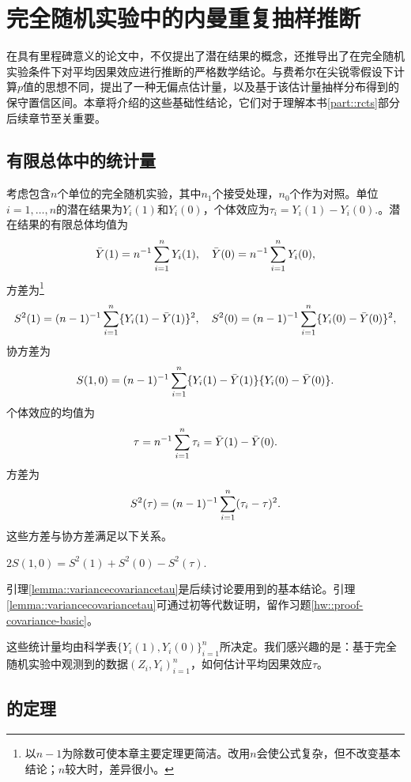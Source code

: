 
\chapter{完全随机实验中的内曼重复抽样推断}\label{chapter::neyman-cr}
 
 
在具有里程碑意义的论文中，\citet{Neyman:1923}不仅提出了潜在结果的概念，还推导出了在完全随机实验条件下对平均因果效应进行推断的严格数学结论。与费希尔在尖锐零假设下计算$p$值的思想不同，\citet{Neyman:1923}提出了一种无偏点估计量，以及基于该估计量抽样分布得到的保守置信区间。本章将介绍\citet{Neyman:1923}的这些基础性结论，它们对于理解本书\ref{part::rcts}部分后续章节至关重要。



\section{有限总体中的统计量}

考虑包含$n$个单位的完全随机实验，其中$n_1$个接受处理，$n_0$个作为对照。单位$i = 1, \ldots, n$的潜在结果为$Y_i(1)$和$Y_i(0)$，个体效应为$\tau_i = Y_i(1) - Y_i(0).$。潜在结果的有限总体均值为
$$
\bar{Y}(1) = n^{-1} \sum_{i=1}^n Y_i(1),\quad
\bar{Y}(0) = n^{-1} \sum_{i=1}^n Y_i(0),
$$
方差为\footnote{以$n-1$为除数可使本章主要定理更简洁。改用$n$会使公式复杂，但不改变基本结论；$n$较大时，差异很小。}
$$
S^2(1) = (n-1)^{-1} \sum_{i=1}^n \{ Y_i(1) -\bar{Y}(1)  \}^2,\quad
S^2(0) = (n-1)^{-1} \sum_{i=1}^n \{ Y_i(0) -\bar{Y}(0)  \}^2 ,
$$
协方差为
$$
S(1,0) = (n-1)^{-1} \sum_{i=1}^n \{ Y_i(1) -\bar{Y}(1)  \}\{ Y_i(0) -\bar{Y}(0)  \} . 
$$
个体效应的均值为
$$
\tau = n^{-1} \sum_{i=1}^n \tau_i = \bar{Y}(1) - \bar{Y}(0) .
$$
方差为
$$
S^2(\tau) = (n-1)^{-1} \sum_{i=1}^n (\tau_i - \tau)^2.
$$
这些方差与协方差满足以下关系。
\begin{lemma}\label{lemma::variancecovariancetau}
$2S(1,0) = S^2(1)+S^2(0) - S^2(\tau).$
\end{lemma}

引理\ref{lemma::variancecovariancetau}是后续讨论要用到的基本结论。引理\ref{lemma::variancecovariancetau}可通过初等代数证明，留作习题\ref{hw::proof-covariance-basic}。 

这些统计量均由科学表$\{ Y_i(1), Y_i(0)  \}_{i=1}^n$所决定。我们感兴趣的是：基于完全随机实验中观测到的数据$ (Z_i, Y_i)_{i=1}^n$，如何估计平均因果效应$\tau$。 


\section{\citet{Neyman:1923}的定理}


